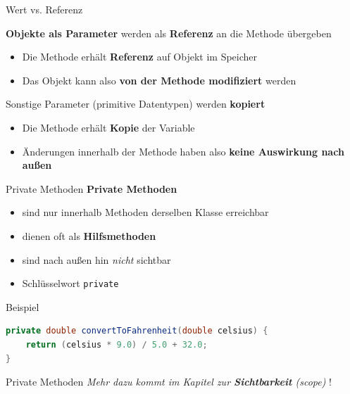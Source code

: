 \documentclass[18pt]{beamer}
\begin{document}
\begin{frame}{Wert vs. Referenz}
    \begin{block}{}
        \textbf{Objekte als Parameter} werden als \textbf{Referenz} an die Methode übergeben
        \begin{itemize}
            \item Die Methode erhält \textbf{Referenz} auf Objekt im Speicher
            \item Das Objekt kann also \textbf{von der Methode modifiziert} werden
        \end{itemize}
    \end{block}

    \begin{block}{}
        Sonstige Parameter (primitive Datentypen) werden \textbf{kopiert}
        \begin{itemize}
            \item Die Methode erhält \textbf{Kopie} der Variable
            \item Änderungen innerhalb der Methode haben also \textbf{keine Auswirkung nach außen}
        \end{itemize}
    \end{block}
\end{frame}


\begin{frame}[fragile]{Private Methoden}
    \textbf{Private Methoden}
    \begin{itemize}
        \item sind nur innerhalb Methoden derselben Klasse erreichbar
        \item dienen oft als \textbf{Hilfsmethoden}
        \item sind nach außen hin \textit{nicht} sichtbar
        \item Schlüsselwort \texttt{private}
    \end{itemize}

    \begin{exampleblock}{Beispiel}
        \begin{lstlisting}[language=Java]
private double convertToFahrenheit(double celsius) {
    return (celsius * 9.0) / 5.0 + 32.0;
}
        \end{lstlisting}
    \end{exampleblock}
\end{frame}

\begin{frame}{Private Methoden}
    \textit{Mehr dazu kommt im Kapitel zur \textbf{Sichtbarkeit} (scope)} !
\end{frame}
\end{document}
